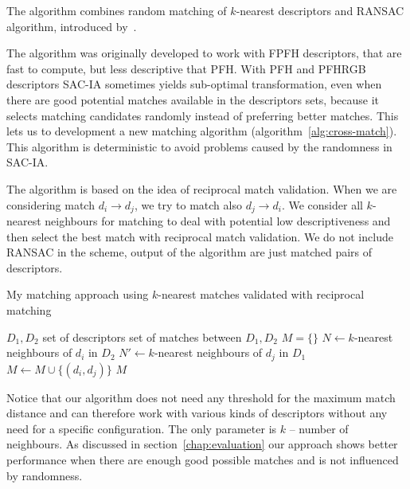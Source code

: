 The algorithm combines random matching of $k$-nearest descriptors and \gls{RANSAC} algorithm, introduced by~\citet{fischler1981ransac}.


The algorithm was originally developed to work with \gls{FPFH} descriptors, that are fast to compute, but less descriptive that \gls{PFH}. With \gls{PFH} and \gls{PFHRGB} descriptors \gls{SAC-IA} sometimes yields sub-optimal transformation, even when there are good potential matches available in the descriptors sets, because it selects matching candidates randomly instead of preferring better matches. This lets us to development a new matching algorithm (algorithm~\ref{alg:cross-match}). This algorithm is deterministic to avoid problems caused by the randomness in \gls{SAC-IA}.

The algorithm is based on the idea of reciprocal match validation. When we are considering match $d_i \rightarrow d_j$, we try to match also $d_j \rightarrow d_i$. We consider all $k$-nearest neighbours for matching to deal with potential low descriptiveness and then select the best match with reciprocal match validation. We do not include \gls{RANSAC} in the scheme, output of the algorithm are just matched pairs of descriptors.

\begin{algorithm}
    \caption[Reciprocal $k$-nearest matching]{My matching approach using $k$-nearest matches validated with reciprocal matching}
    \label{alg:cross-match}
    \begin{algorithmic}[1]
        \Require $D_1, D_2$ set of descriptors
        \Ensure set of matches between $D_1, D_2$
            \State $M = \{\}$
                \State $N \gets k$-nearest neighbours of $d_i$ in $D_2$
                    \State $N' \gets k$-nearest neighbours of $d_j$ in $D_1$
                        \State $M \gets M \cup \{(d_i, d_j)\}$
                    \EndIf
                \EndFor
            \EndFor
            \State \Return $M$
        \EndFunction
    \end{algorithmic}
\end{algorithm}

Notice that our algorithm does not need any threshold for the maximum match distance and can therefore work with various kinds of descriptors without any need for a specific configuration. The only parameter is $k$ -- number of neighbours. As discussed in section~\ref{chap:evaluation} our approach shows better performance when there are enough good possible matches and is not influenced by randomness.

